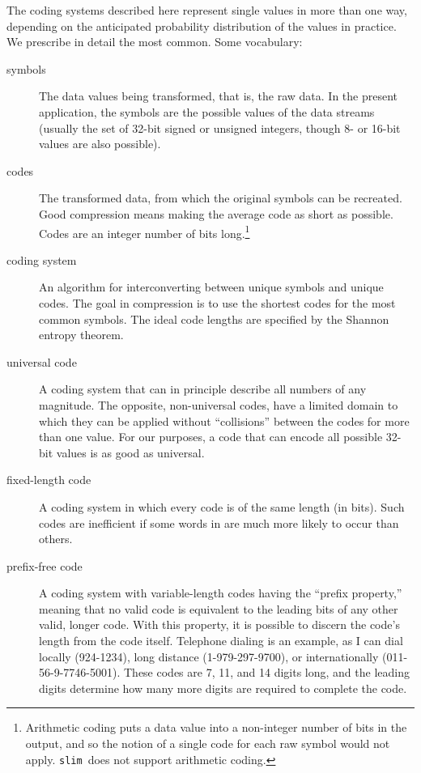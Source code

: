 \documentclass[11pt]{article}
\newcommand{\slim}{{\tt slim}}
\begin{document}
The coding systems described here represent single values in more than
one way, depending on the anticipated probability distribution of the
values in practice.  We prescribe in detail the most common.  
Some vocabulary:
%
\begin{description}
\item[symbols] The data values being transformed, that is, the raw
  data.  In the present application, the symbols are the possible
  values of the data streams (usually the set of 32-bit signed or
  unsigned integers, though 8- or 16-bit values are also possible).
\item[codes] The transformed data, from which the original symbols can
  be recreated.  Good compression means making the average code as
  short as possible.  Codes are an integer number of bits
  long.\footnote{Arithmetic coding puts a data value into a
  non-integer number of bits in the output, and so the notion of a
  single code for each raw symbol would not apply.  \slim\ does not
  support arithmetic coding.}
\item[coding system] An algorithm for interconverting between unique
  symbols and unique codes.  The goal in compression is to
  use the shortest codes for the most common symbols.  The ideal code
  lengths are specified by the Shannon entropy theorem.
\item[universal code] A coding system that can in principle describe
  all numbers of any magnitude.  The opposite, non-universal codes,
  have a limited domain to which they can be applied without
  ``collisions'' between the codes for more than one value.  For our
  purposes, a code that can encode all possible 32-bit values is as
  good as universal.
\item[fixed-length code] A coding system in which every code is of the
  same length (in bits).  Such codes are inefficient if some words in
  are much more likely to occur than others.
\item[prefix-free code] A coding system with variable-length codes having
  the ``prefix property,'' meaning that no valid code is equivalent to
  the leading bits of any other valid, longer code.  With this
  property, it is possible to discern the code's length from the code
  itself.  Telephone dialing is an example, as I can dial locally
  (924-1234), long distance (1-979-297-9700), or internationally
  (011-56-9-7746-5001).  These codes are 7, 11, and 14 digits long,
  and the leading digits determine how many more digits are required
  to complete the code.
\end{description}
\end{document}
